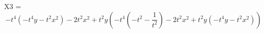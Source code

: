 \documentclass{article}
\begin{document}
X3 = 
    $$ - t^{4} \left(- t^{4} y - t^{2} x^{2}\right) - 2 t^{2} x^{2} + t^{2} y \left(- t^{4} \left(- t^{2} - \frac{1}{t^{2}}\right) - 2 t^{2} x^{2} + t^{2} y \left(- t^{4} y - t^{2} x^{2}\right)\right) $$
    
\end{document}
